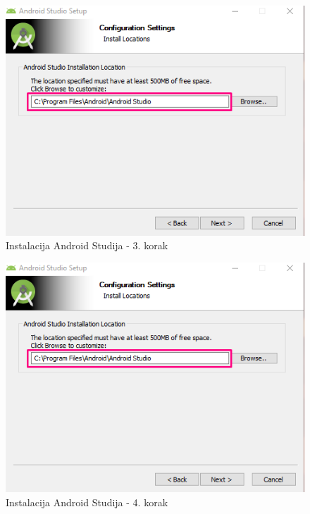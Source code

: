 \documentclass[11pt,a4paper,twoside]{article}
\begin{document}
\begin{figure}[!h]
	\centering
	\includegraphics{install_04.png}
	\caption{Instalacija Android Studija - 3. korak}
	\label{fig:install_03}	
\end{figure}

\begin{figure}[!h]
	\centering
	\includegraphics{install_04.png}
	\caption{Instalacija Android Studija - 4. korak}
	\label{fig:install_04}	
\end{figure}
\end{document}
